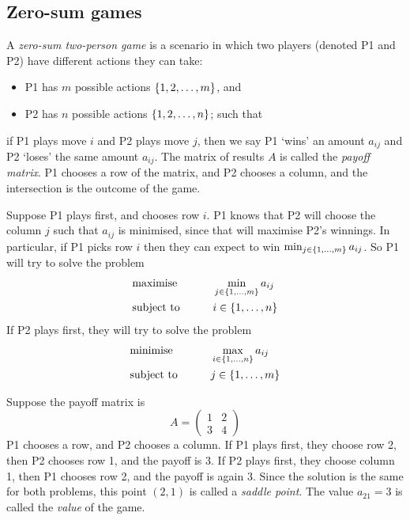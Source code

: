 \subsection{Zero-sum games}
\begin{definition}
	A \textit{zero-sum two-person game} is a scenario in which two players (denoted P1 and P2) have different actions they can take:
	\begin{itemize}
		\item P1 has \( m \) possible actions \( \qty{1, 2, \dots, m } \), and
		\item P2 has \( n \) possible actions \( \qty{1, 2, \dots, n } \); such that
	\end{itemize}
	if P1 plays move \( i \) and P2 plays move \( j \), then we say P1 `wins' an amount \( a_{ij} \) and P2 `loses' the same amount \( a_{ij} \).
	The matrix of results \( A \) is called the \textit{payoff matrix}.
	P1 chooses a row of the matrix, and P2 chooses a column, and the intersection is the outcome of the game.
\end{definition}
Suppose P1 plays first, and chooses row \( i \).
P1 knows that P2 will choose the column \( j \) such that \( a_{ij} \) is minimised, since that will maximise P2's winnings.
In particular, if P1 picks row \( i \) then they can expect to win \( \min_{j \in \qty{1,\dots,m}} a_{ij} \).
So P1 will try to solve the problem
\begin{alignat*}{2}
	 & \text{maximise}   & \qquad & \min_{j \in \qty{1,\dots,m}} a_{ij} \\
	 & \text{subject to} &        & i \in \qty{1,\dots,n}
\end{alignat*}
If P2 plays first, they will try to solve the problem
\begin{alignat*}{2}
	 & \text{minimise}   & \qquad & \max_{i \in \qty{1,\dots,n}} a_{ij} \\
	 & \text{subject to} &        & j \in \qty{1,\dots,m}
\end{alignat*}
\begin{example}
	Suppose the payoff matrix is
	\[
		A = \begin{pmatrix}
			1 & 2 \\ 3 & 4
		\end{pmatrix}
	\]
	P1 chooses a row, and P2 chooses a column.
	If P1 plays first, they choose row 2, then P2 chooses row 1, and the payoff is 3.
	If P2 plays first, they choose column 1, then P1 chooses row 2, and the payoff is again 3.
	Since the solution is the same for both problems, this point \( (2,1) \) is called a \textit{saddle point}.
	The value \( a_{21} = 3 \) is called the \textit{value} of the game.
\end{example}
